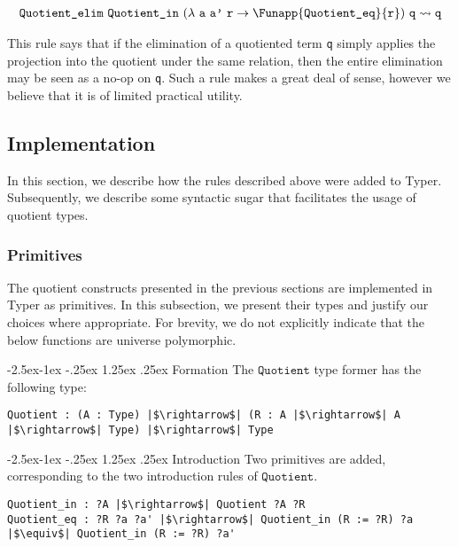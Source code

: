 \documentclass[12pt,twoside,maitrise]{dms}
\makeatletter
\theoremstyle{definition}
\numberwithin{equation}{section}
\numberwithin{table}{chapter}
\numberwithin{figure}{chapter}
\newcommand\id[1] {\texttt{#1}}
\newcommand\fn[1] {\texttt{#1}}
\renewcommand\paragraph{\@startsection{paragraph}{4}{\z@}%
            {-2.5ex\@plus -1ex \@minus -.25ex}%
            {1.25ex \@plus .25ex}%
            {\normalfont\normalsize\bfseries}}
\makeatother
\begin{document}
\begin{align*}
  & \fn{Quotient\_elim} \ \id{Quotient\_in} \ (\lambda \ \id{a} \ \id{a'} \ \id{r} \rightarrow \Funapp{\id{Quotient\_eq}}{\id{r}}) \ \id{q} \rightsquigarrow{} \id{q} \\
\end{align*}

This rule says that if the elimination of a quotiented term \id{q} simply
applies the projection into the quotient under the same relation, then the
entire elimination may be seen as a no-op on \id{q}. Such a rule makes a great
deal of sense, however we believe that it is of limited practical utility.

\subsection{Implementation}

In this section, we describe how the rules described above were added to Typer.
Subsequently, we describe some syntactic sugar that facilitates the usage of
quotient types.

\subsubsection{Primitives}

The quotient constructs presented in the previous sections are implemented in
Typer as primitives. In this subsection, we present their types and justify our
choices where appropriate. For brevity, we do not explicitly indicate that the
below functions are universe polymorphic.

\paragraph{Formation}
The $\id{Quotient}$ type former has the following type:

\begin{verbatim}
Quotient : (A : Type) |$\rightarrow$| (R : A |$\rightarrow$| A |$\rightarrow$| Type) |$\rightarrow$| Type
\end{verbatim}

\paragraph{Introduction}
Two primitives are added, corresponding to the two introduction rules of $\id{Quotient}$.

\begin{verbatim}
Quotient_in : ?A |$\rightarrow$| Quotient ?A ?R
Quotient_eq : ?R ?a ?a' |$\rightarrow$| Quotient_in (R := ?R) ?a |$\equiv$| Quotient_in (R := ?R) ?a'
\end{verbatim}
\end{document}

